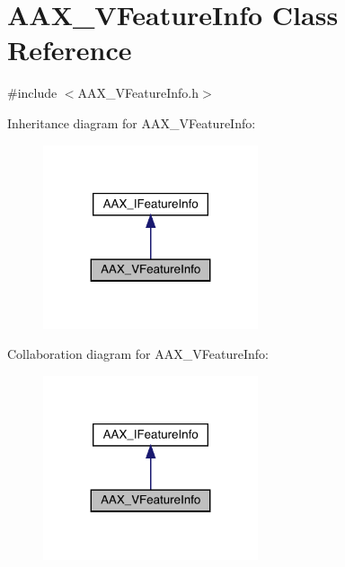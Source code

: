 \hypertarget{a01917}{}\section{A\+A\+X\+\_\+\+V\+Feature\+Info Class Reference}
\label{a01917}


{\ttfamily \#include $<$A\+A\+X\+\_\+\+V\+Feature\+Info.\+h$>$}



Inheritance diagram for A\+A\+X\+\_\+\+V\+Feature\+Info\+:
\nopagebreak
\begin{figure}[H]
\begin{center}
\leavevmode
\includegraphics[width=179pt]{a01916}
\end{center}
\end{figure}


Collaboration diagram for A\+A\+X\+\_\+\+V\+Feature\+Info\+:
\nopagebreak
\begin{figure}[H]
\begin{center}
\leavevmode
\includegraphics[width=179pt]{a01915}
\end{center}
\end{figure}


